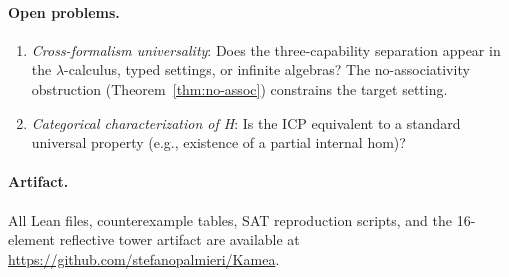 \documentclass[sigconf,screen]{acmart}
\theoremstyle{remark}
\begin{document}
\paragraph{Open problems.}
\begin{enumerate}
  \item \emph{Cross-formalism universality}: Does the three-capability separation appear in the $\lambda$-calculus, typed settings, or infinite algebras? The no-associativity obstruction (Theorem~\ref{thm:no-assoc}) constrains the target setting.
  \item \emph{Categorical characterization of H}: Is the ICP equivalent to a standard universal property (e.g., existence of a partial internal hom)?
\end{enumerate}

\paragraph{Artifact.}
All Lean files, counterexample tables, SAT reproduction scripts, and the 16-element reflective tower artifact are available at \url{https://github.com/stefanopalmieri/Kamea}.

\end{document}
